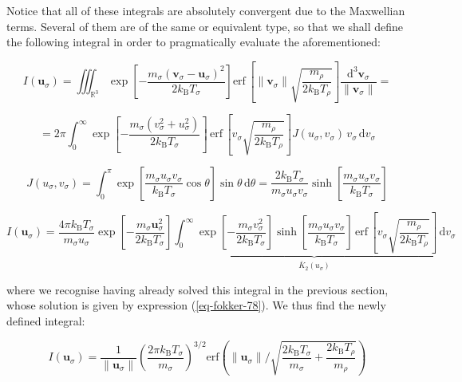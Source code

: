 Notice that all of these integrals are absolutely convergent due to the Maxwellian terms. Several of them are of the same or equivalent type, so that we shall define the following integral in order to pragmatically evaluate the aforementioned:

\begin{equation}
    I(\mathbf{u}_\sigma)=\iiint_{\mathbb{R}^3}\exp{\left[-\frac{m_\sigma(\mathbf{v}_\sigma-\mathbf{u}_\sigma)^2}{2k_\mathrm{B}T_\sigma}\right]}\text{erf}\,\left[\|\mathbf{v}_\sigma\|\sqrt{\frac{m_\rho}{2k_\mathrm{B}T_\rho}}\right]\frac{\mathrm{d}^3\mathbf{v}_\sigma}{\|\mathbf{v}_\sigma\|}=
\end{equation}

\begin{equation}
    =2\pi\int_0^\infty\exp{\left[-\frac{m_\sigma(v_\sigma^2+u_\sigma^2)}{2k_\mathrm{B}T_\sigma}\right]}\,\text{erf}\,\left[v_\sigma\sqrt{\frac{m_\rho}{2k_\mathrm{B}T_\rho}}\right]J(u_\sigma, v_\sigma)\,v_\sigma\,\mathrm{d}v_\sigma
\end{equation}

\begin{equation}
    J(u_\sigma,v_\sigma)=\int_0^\pi\exp{\left[\frac{m_\sigma u_\sigma v_\sigma}{k_\mathrm{B}T_\sigma}\cos{\theta}\right]}\sin{\theta}\,\mathrm{d}\theta=\frac{2k_\mathrm{B}T_\sigma}{m_\sigma u_\sigma v_\sigma}\sinh{\left[\frac{m_\sigma u_\sigma v_\sigma}{k_\mathrm{B}T_\sigma}\right]}
\end{equation}

\begin{equation}
    I(\mathbf{u}_\sigma)=\frac{4\pi k_\mathrm{B}T_\sigma}{m_\sigma u_\sigma}\exp{\left[-\frac{m_\sigma\mathbf{u}_\sigma^2}{2k_\mathrm{B}T_\sigma}\right]}\underbrace{\int_0^\infty\exp{\left[-\frac{m_\sigma v_\sigma^2}{2k_\mathrm{B}T_\sigma}\right]}\sinh{\left[\frac{m_\sigma u_\sigma v_\sigma}{k_\mathrm{B}T_\sigma}\right]}\,\text{erf}\,\left[v_\sigma\sqrt{\frac{m_\rho}{2k_\mathrm{B}T_\rho}}\right]\,\mathrm{d}v_\sigma}_{\bar{K}_2(u_\sigma)}
\end{equation}

where we recognise having already solved this integral in the previous section, whose solution is given by expression (\ref{eq-fokker-78}). We thus find the newly defined integral:

\begin{equation}
    I(\mathbf{u}_\sigma)=\frac{1}{\|\mathbf{u}_\sigma\|}\left(\frac{2\pi k_\mathrm{B}T_\sigma}{m_\sigma}\right)^{3/2}\text{erf}\left(\|\mathbf{u}_\sigma\|\bigg/{\sqrt{\frac{2k_\mathrm{B}T_\sigma}{m_\sigma}+\frac{2k_\mathrm{B}T_\rho}{m_\rho}}}\right)
\end{equation}


